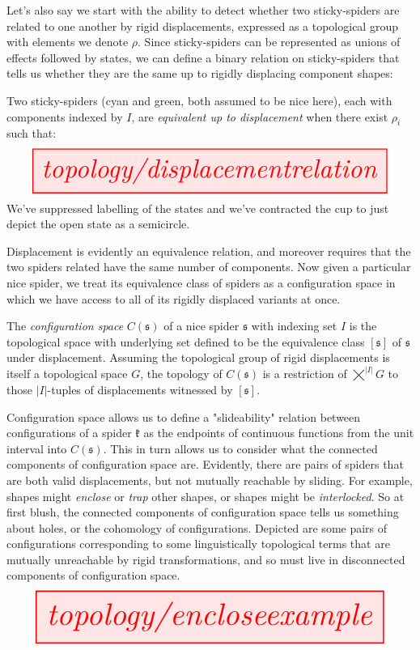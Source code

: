 Let's also say we start with the ability to detect whether two sticky-spiders are related to one another by rigid displacements, expressed as a topological group with elements we denote $\rho$. Since sticky-spiders can be represented as unions of effects followed by states, we can define a binary relation on sticky-spiders that tells us whether they are the same up to rigidly displacing component shapes:

\begin{defn}
Two sticky-spiders (cyan and green, both assumed to be nice here), each with components indexed by $I$, are \emph{equivalent up to displacement} when there exist $\rho_i$ such that:
\[\resizebox{\textwidth}{!}{\tikzfig{topology/displacementrelation}}\]
We've suppressed labelling of the states and we've contracted the cup to just depict the open state as a semicircle.
\end{defn}

Displacement is evidently an equivalence relation, and moreover requires that the two spiders related have the same number of components. Now given a particular nice spider, we treat its equivalence class of spiders as a configuration space in which we have access to all of its rigidly displaced variants at once.

\begin{defn}\label{defn:configurationspace}
The \emph{configuration space} $C(\mathfrak{s})$ of a nice spider $\mathfrak{s}$ with indexing set $I$ is the topological space with underlying set defined to be the equivalence class $[\mathfrak{s}]$ of $\mathfrak{s}$ under displacement. Assuming the topological group of rigid displacements is itself a topological space $G$, the topology of $C(\mathfrak{s})$ is a restriction of $\bigtimes^{|I|} G$ to those $|I|$-tuples of displacements witnessed by $[\mathfrak{s}]$.
\end{defn}

\begin{example}
Configuration space allows us to define a "slideability" relation between configurations of a spider $\mathfrak{k}$ as the endpoints of continuous functions from the unit interval into $C(\mathfrak{s})$. This in turn allows us to consider what the connected components of configuration space are. Evidently, there are pairs of spiders that are both valid displacements, but not mutually reachable by sliding. For example, shapes might \emph{enclose} or \emph{trap} other shapes, or shapes might be \emph{interlocked}. So at first blush, the connected components of configuration space tells us something about holes, or the cohomology of configurations. Depicted are some pairs of configurations corresponding to some linguistically topological terms that are mutually unreachable by rigid transformations, and so must live in disconnected components of configuration space.
\[\resizebox{\textwidth}{!}{\tikzfig{topology/encloseexample}}\]
\end{example}

